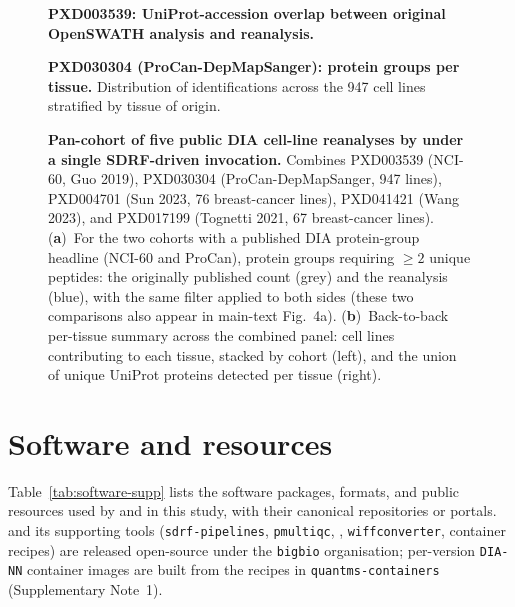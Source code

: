 \documentclass[preprint,12pt]{elsarticle}
\begin{document}
\begin{figure}[htbp]
  \centering
  \caption[PXD003539 accession overlap]{%
    \textbf{PXD003539: UniProt-accession overlap between original
    OpenSWATH analysis and \quantmsdiann{} reanalysis.}
  }
  \label{fig:supp-pxd003539-venn}
\end{figure}

\begin{figure}[htbp]
  \centering
  \caption[PXD030304 per tissue]{%
    \textbf{PXD030304 (ProCan-DepMapSanger): protein groups per tissue.}
    Distribution of identifications across the 947 cell lines stratified by
    tissue of origin.
  }
  \label{fig:supp-pxd030304-tissue}
\end{figure}

\begin{figure}[htbp]
  \centering
  \caption[Pan-cohort cell-line atlas]{%
    \textbf{Pan-cohort of five public DIA cell-line reanalyses by
    \quantmsdiann{} under a single SDRF-driven invocation.}
    Combines PXD003539 (NCI-60, Guo 2019), PXD030304 (ProCan-DepMapSanger,
    947 lines), PXD004701 (Sun 2023, 76 breast-cancer lines), PXD041421
    (Wang 2023), and PXD017199 (Tognetti 2021, 67 breast-cancer lines).
    (\textbf{a})~For the two cohorts with a published DIA protein-group
    headline (NCI-60 and ProCan), protein groups requiring $\geq 2$ unique
    peptides: the originally published count (grey) and the \quantmsdiann{}
    reanalysis (blue), with the same filter applied to both sides (these two
    comparisons also appear in main-text Fig.~4a).
    (\textbf{b})~Back-to-back per-tissue summary across the combined panel:
    cell lines contributing to each tissue, stacked by cohort (left), and the
    union of unique UniProt proteins detected per tissue (right).
  }
  \label{fig:supp-pancohort-atlas}
\end{figure}

\section{Software and resources}
\label{sec:supp-software}

Table~\ref{tab:software-supp} lists the software packages, formats, and public
resources used by \quantmsdiann{} and in this study, with their canonical
repositories or portals. \quantmsdiann{} and its supporting tools
(\texttt{sdrf-pipelines}, \texttt{pmultiqc}, \qpx{}, \texttt{wiffconverter},
container recipes) are released open-source under the \texttt{bigbio}
organisation; per-version \texttt{DIA-NN} container images are built from the
recipes in \texttt{quantms-containers} (Supplementary Note~1).
\end{document}

